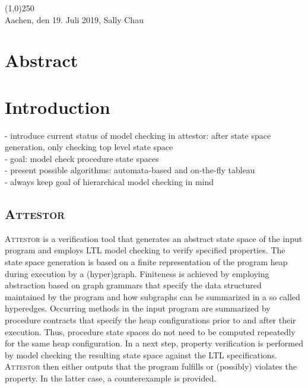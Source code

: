 \documentclass[a4paper, 12pt, twoside]{report}
\begin{document}
	\noindent\line(1,0){250}\\
	Aachen, den 19. Juli 2019, Sally Chau
	
	\clearpage\mbox{}\clearpage
	
	\chapter*{Abstract}
	
	\clearpage\mbox{}\clearpage
	
	\doublespacing
	\tableofcontents
	\singlespacing
	\clearpage\mbox{}\clearpage
	\thispagestyle{empty} 
	
	\pagestyle{fancy}
	\fancyhead[RE]{\nouppercase\leftmark}
	\fancyhead[LO]{\nouppercase\rightmark}
	\fancyhead[LE,RO]{\thepage}
	\cfoot{}
	
	
	\chapter{Introduction}
	- introduce current status of model checking in attestor: after state space generation, only checking top level state space\\
	- goal: model check procedure state spaces \\
	- present possible algorithms: automata-based and on-the-fly tableau\\
	- always keep goal of hierarchical model checking in mind
	
	
	\section{\textsc{Attestor}}
	
	\textsc{Attestor} is a verification tool that generates an abstract state space of the input program and employs LTL model checking to verify specified properties. The state space generation is based on a finite representation of the program heap during execution by a (hyper)graph. Finiteness is achieved by employing abstraction based on graph grammars that specify the data structured maintained by the program and how subgraphs can be summarized in a so called hyperedges. Occurring methods in the input program are summarized by procedure contracts that specify the heap configurations prior to and after their execution. Thus, procedure state spaces do not need to be computed repeatedly for the same heap configuration. In a next step, property verification is performed by model checking the resulting state space against the LTL specifications. \textsc{Attestor} then either outputs that the program fulfills or (possibly) violates the property. In the latter case, a counterexample is provided.\\
	
\end{document}

